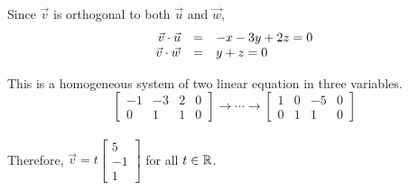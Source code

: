 \documentclass[pdf,9pt]{beamer}
\begin{document}
{{\begin{solution}
    \pause
    Since $\vec{v}$ is orthogonal to both $\vec{u}$ and $\vec{w}$,
    \[ \begin{array}{rcl}
	\vec{v}\cdot\vec{u} & = & -x-3y+2z=0 \\
	\vec{v}\cdot\vec{w} & = & y+z=0
    \end{array}\]
\end{solution}
}
\begin{frame}[fragile]
    \begin{solution}[continued]
	This is a homogeneous system of two linear equation in three
	variables.
	\[
	    \left[\begin{array}{rrr|r}
		    -1 & -3 & 2 & 0 \\
		    0 & 1 & 1 & 0
	    \end{array}\right]
	    \rightarrow \cdots \rightarrow
	    \left[\begin{array}{rrr|r}
		    1 & 0 & -5 & 0 \\
		    0 & 1 & 1 & 0
	    \end{array}\right]
	\]
	\\
	Therefore,
	$\vec{v}=t\left[\begin{array}{r}
	5 \\ -1 \\ 1
	\end{array}\right]$ for all $t\in\mathbb{R}$.
   \end{solution}
\end{frame}
}
\end{document}
